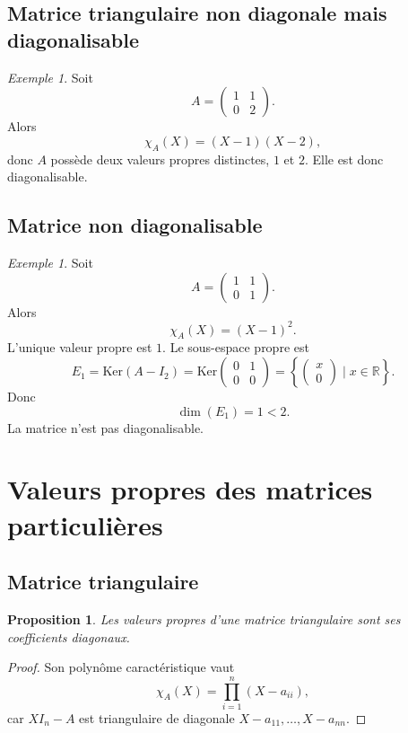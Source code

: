 \documentclass[11pt,a4paper]{article}
\newtheorem{proposition}[definition]{Proposition}
\theoremstyle{remark}
\newtheorem{exemple}[definition]{Exemple}
\newcommand{\R}{\mathbb{R}}
\newcommand{\Ker}{\mathrm{Ker}}
\newcommand{\chiA}{\chi_A}
\begin{document}
\subsection{Matrice triangulaire non diagonale mais diagonalisable}

\begin{exemple}
Soit
\[
A=
\begin{pmatrix}
1 & 1\\
0 & 2
\end{pmatrix}.
\]
Alors
\[
\chiA(X)=(X-1)(X-2),
\]
donc \(A\) possède deux valeurs propres distinctes, \(1\) et \(2\). Elle est donc diagonalisable.
\end{exemple}

\subsection{Matrice non diagonalisable}

\begin{exemple}
Soit
\[
A=
\begin{pmatrix}
1 & 1\\
0 & 1
\end{pmatrix}.
\]
Alors
\[
\chiA(X)=(X-1)^2.
\]
L’unique valeur propre est \(1\). Le sous-espace propre est
\[
E_1=\Ker(A-I_2)=
\Ker\begin{pmatrix}
0 & 1\\
0 & 0
\end{pmatrix}
=
\left\{
\begin{pmatrix}
x\\0
\end{pmatrix}
\mid x\in\R
\right\}.
\]
Donc
\[
\dim(E_1)=1<2.
\]
La matrice n’est pas diagonalisable.
\end{exemple}

\section{Valeurs propres des matrices particulières}

\subsection{Matrice triangulaire}

\begin{proposition}
Les valeurs propres d’une matrice triangulaire sont ses coefficients diagonaux.
\end{proposition}

\begin{proof}
Son polynôme caractéristique vaut
\[
\chiA(X)=\prod_{i=1}^n (X-a_{ii}),
\]
car \(XI_n-A\) est triangulaire de diagonale \(X-a_{11},\dots,X-a_{nn}\).
\end{proof}
\end{document}
